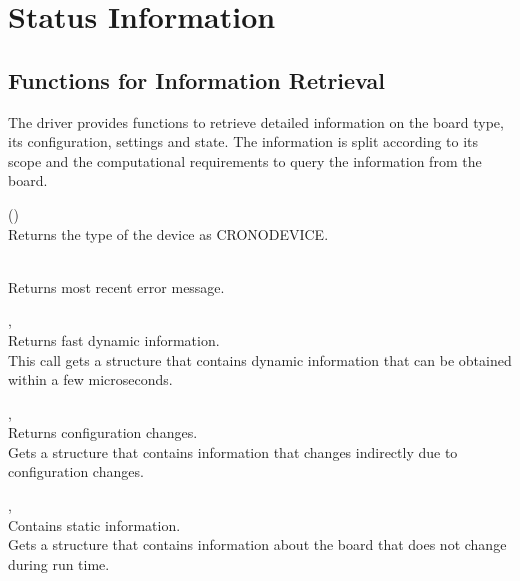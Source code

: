\section{Status Information}
	

\subsection{Functions for Information Retrieval}
    The driver provides functions to retrieve detailed information on the board type, its configuration, settings and state. 
    The information is split according to its scope and the computational requirements to query the information from the board.
    

    (\device{})\\
    Returns the type of the device as \textsf{CRONO\tu DEVICE\tu {}}.\par

    \\
    Returns most recent error message.
    \par

    \deviceindex, \lb{}\\
    Returns fast dynamic information.\\
    This call gets a structure that contains dynamic information that can be obtained within a few microseconds.\par

    \deviceindex, \lb{}\\
    Returns configuration changes.\\
    Gets a structure that contains information that changes indirectly due to configuration changes.\par


    \deviceindex, \lb{}\\
    Contains static information.\\
    Gets a structure that contains information about the board that does not change during run time.\par 

